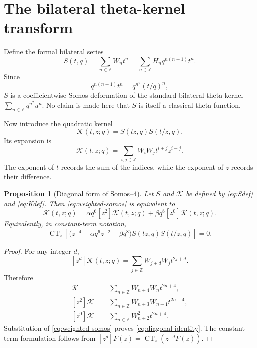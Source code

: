 \documentclass[11pt]{article}
\newtheorem{proposition}{Proposition}
\newcommand{\CT}{\operatorname{CT}}
\begin{document}
\section{The bilateral theta-kernel transform}
Define the formal bilateral series
\begin{equation}
 S(t,q)=\sum_{n\in\mathbb Z}W_nt^n
       =\sum_{n\in\mathbb Z}H_nq^{n(n-1)}t^n.
 \label{eq:Sdef}
\end{equation}
Since
\[
 q^{n(n-1)}t^n=q^{n^2}(t/q)^n,
\]
$S$ is a coefficientwise Somos deformation of the standard bilateral theta kernel
$\sum_{n\in\mathbb Z}q^{n^2}u^n$.  No claim is made here that $S$ is itself a classical theta function.

Now introduce the quadratic kernel
\begin{equation}
 \mathcal K(t,z;q)=S(tz,q)S(t/z,q).
 \label{eq:Kdef}
\end{equation}
Its expansion is
\begin{equation}
 \mathcal K(t,z;q)
 =\sum_{i,j\in\mathbb Z}W_iW_jt^{i+j}z^{i-j}.
 \label{eq:Kexpand}
\end{equation}
The exponent of $t$ records the sum of the indices, while the exponent of $z$ records their difference.

\begin{proposition}[Diagonal form of Somos--4]
Let $S$ and $\mathcal K$ be defined by \eqref{eq:Sdef} and \eqref{eq:Kdef}. Then \eqref{eq:weighted-somos} is equivalent to
\begin{equation}
 [z^4]\mathcal K(t,z;q)
 =\alpha q^6[z^2]\mathcal K(t,z;q)
 +\beta q^8[z^0]\mathcal K(t,z;q).
 \label{eq:diagonal-identity}
\end{equation}
Equivalently, in constant-term notation,
\begin{equation}
 \CT_z\!\left[
 \bigl(z^{-4}-\alpha q^6z^{-2}-\beta q^8\bigr)
 S(tz,q)S(t/z,q)
 \right]=0.
 \label{eq:CTidentity}
\end{equation}
\end{proposition}

\begin{proof}
For any integer $d$,
\[
 [z^d]\mathcal K(t,z;q)
 =\sum_{j\in\mathbb Z}W_{j+d}W_jt^{2j+d}.
\]
Therefore
\begin{align*}
 [z^4]\mathcal K
 &=\sum_{n\in\mathbb Z}W_{n+4}W_nt^{2n+4},\\
 [z^2]\mathcal K
 &=\sum_{n\in\mathbb Z}W_{n+3}W_{n+1}t^{2n+4},\\
 [z^0]\mathcal K
 &=\sum_{n\in\mathbb Z}W_{n+2}^2t^{2n+4}.
\end{align*}
Substitution of \eqref{eq:weighted-somos} proves \eqref{eq:diagonal-identity}. The constant-term formulation follows from $[z^d]F(z)=\CT_z(z^{-d}F(z))$.
\end{proof}
\end{document}
